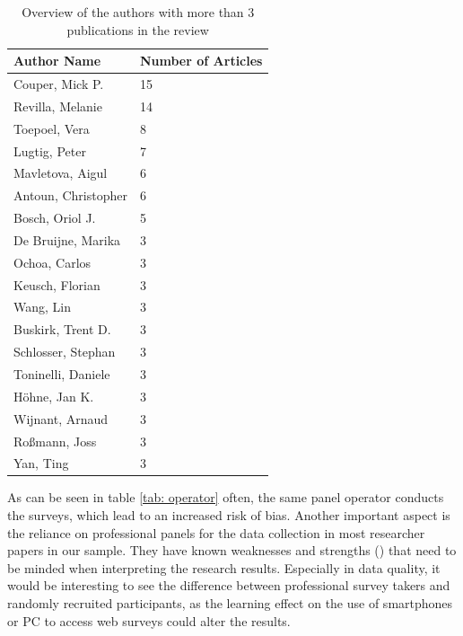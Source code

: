 \begin{table}
	\centering
	\begin{tabular}{ll}
		\toprule
		Author Name & Number of Articles \\
		\midrule
		Couper, Mick P. &        15 \\
        Revilla, Melanie &      14\\
        Toepoel, Vera  &         8\\
        Lugtig, Peter   &        7\\
        Mavletova, Aigul    &    6\\
        Antoun, Christopher  &   6\\
        Bosch, Oriol J.   &      5\\
        De Bruijne, Marika  &    3\\
        Ochoa, Carlos      &     3\\
        Keusch, Florian     &    3\\
        Wang, Lin           &    3\\
        Buskirk, Trent D.     &  3\\
        Schlosser, Stephan  &   3\\
        Toninelli, Daniele   &   3\\
        Höhne, Jan K.        &   3\\
        Wijnant, Arnaud      &   3\\
        Roßmann, Joss       &    3\\
        Yan, Ting            &   3\\
		\bottomrule 
	\end{tabular}
	\caption{Overview of the authors with more than 3 publications in the review}
	\label{tab: authors}
\end{table}

As can be seen in table \ref{tab: operator} often, the same panel operator conducts the surveys, which lead to an increased risk of bias. Another important aspect is the reliance on professional panels for the data collection in most researcher papers in our sample. They have known weaknesses and strengths (\cite{callegaro_online_2014, kees_analysis_2017}) that need to be minded when interpreting the research results. Especially in data quality, it would be interesting to see the difference between professional survey takers and randomly recruited participants, as the learning effect on the use of smartphones or PC to access web surveys could alter the results.

